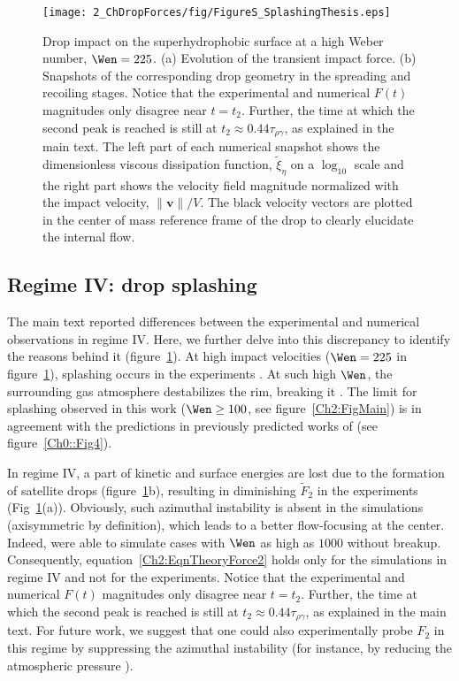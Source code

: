 \begin{subappendices}
	\begin{sidewaysfigure}
		\texttt{[image: 2\_ChDropForces/fig/FigureS\_SplashingThesis.eps]}
		\caption{Drop impact on the superhydrophobic surface at a high Weber number, $\Wen = 225$. (a) Evolution of the transient impact force. (b) Snapshots of the corresponding drop geometry in the spreading and recoiling stages. Notice that the experimental and numerical $F(t)$ magnitudes only disagree near $t = t_2$. Further, the time at which the second peak is reached is still at $t_2 \approx 0.44\tau_{\rho\gamma}$, as explained in the main text. The left part of each numerical snapshot shows the dimensionless viscous dissipation function, $\tilde{\xi}_\eta$ on a $\log_{10}$ scale and the right part shows the velocity field magnitude normalized with the impact velocity, $\|\boldsymbol{v}\|/V$. The black velocity vectors are plotted in the center of mass reference frame of the drop to clearly elucidate the internal flow.}
		\label{Ch2:Fig_Splashing}
	\end{sidewaysfigure}
	
	\subsection{Regime IV: drop splashing}

	The main text reported differences between the experimental and numerical observations in regime IV. Here, we further delve into this discrepancy to identify the reasons behind it (figure~\ref{Ch2:Fig_Splashing}). At high impact velocities ($\Wen = 225$ in figure~\ref{Ch2:Fig_Splashing}), splashing occurs in the experiments \cite{josserand2016drop}. At such high $\Wen$, the surrounding gas atmosphere destabilizes the rim, breaking it  \cite{eggers2010drop, riboux2014experiments}. The limit for splashing observed in this work ($\Wen \ge 100$, see figure~\ref{Ch2:FigMain}) is in agreement with the predictions in previously predicted works of \citet{derby2010inkjet, riboux2014experiments, lohse2022fundamental} (see figure~\ref{Ch0::Fig4}).  
	
	In regime IV, a part of kinetic and surface energies are lost due to the formation of satellite drops (figure~\ref{Ch2:Fig_Splashing}b), resulting in diminishing $\tilde{F}_2$ in the experiments (Fig~\ref{Ch2:Fig_Splashing}(a)). Obviously, such azimuthal instability is absent in the simulations (axisymmetric by definition), which leads to a better flow-focusing at the center. Indeed, \citet{eggers2010drop} were able to simulate cases with $\Wen$ as high as $1000$ without breakup. Consequently, equation~\eqref{Ch2:EqnTheoryForce2} holds only for the simulations in regime IV and not for the experiments. Notice that the experimental and numerical $F(t)$ magnitudes only disagree near $t = t_2$. Further, the time at which the second peak is reached is still at $t_2 \approx 0.44\tau_{\rho\gamma}$, as explained in the main text. For future work, we suggest that one could also experimentally probe $F_2$ in this regime by suppressing the azimuthal instability (for instance, by reducing the atmospheric pressure \cite{xu2005drop}). 
	

\end{subappendices}
